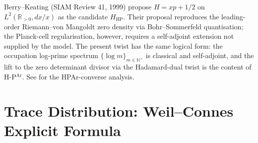 \begin{remark}
\label{v4-arith:w5-b:rem:berry-keating-contrast}
Berry--Keating (SIAM Review 41, 1999) propose \(H=xp+1/2\) on
\(L^{2}(\mathbb{R}_{>0},dx/x)\) as the candidate \(H_{\mathrm{HP}}\).
Their proposal reproduces the leading-order Riemann--von Mangoldt
zero density via Bohr--Sommerfeld quantisation; the Planck-cell
regularisation, however, requires a self-adjoint extension not supplied
by the model. The present twist has the same logical form: the occupation
log-prime spectrum \(\{\log m\}_{m\in\mathbb{N}^{\times}}\) is
classical and self-adjoint, and the lift to the zero determinant
divisor via the Hadamard-dual twist is the content of
H-P\(^{\mathrm{Ar}}\). See
 for the HPAr-converse analysis.
\end{remark}

\section{Trace Distribution: Weil--Connes Explicit Formula}
\label{v4-arith:w5-b:trace}

